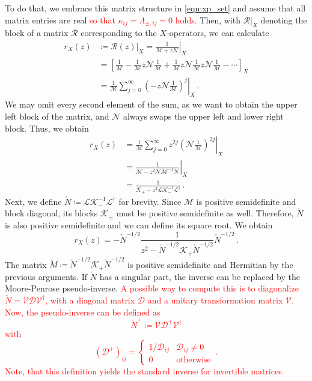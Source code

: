 \documentclass[
    reprint, 
    aps,
    preprintnumbers,
    twocolumn,
    prb,
    superscriptaddress
]{revtex4-2}
\newcommand{\mM}{\mathcal{M}}
\newcommand{\mN}{\mathcal{N}}
\newcommand{\markEdited}{red}
\begin{document}
To do that, we embrace this matrix structure in \eqref{eqn:xp_set} and assume that all matrix entries are real \textcolor{\markEdited}{so that $\kappa_{ij} = \Lambda_{\pm,ij} = 0$ holds}.
Then, with $\mathcal{R}|_X$ denoting the block of a matrix $\mathcal{R}$ corresponding to the $X$-operators, we can calculate
\begin{align}
    r_X (z) &\coloneqq \mathcal{R}(z)|_X = \left. \frac{1}{\mM + z \mN} \right\vert_X \nonumber \\
        &= \left[ \frac{1}{\mM} - \frac{1}{\mM} z \mN \frac{1}{\mM} + \frac{1}{\mM} z \mN \frac{1}{\mM} z \mN \frac{1}{\mM} - \cdots \right]_X \nonumber \\
        &= \left. \frac{1}{\mM} \sum_{j=0}^\infty \left( -z \mN \frac{1}{\mM} \right)^j \right\vert_X \,.
\end{align}
We may omit every second element of the sum, as we want to obtain the upper left block of the matrix, and $\mN$ always swaps the upper left and lower right block.
Thus, we obtain
\begin{align}
    r_X (z) &= \left. \frac{1}{\mM} \sum_{j=0}^\infty z^{2j} \left( \mN \frac{1}{\mM} \right)^{2j} \right\vert_X \nonumber \\
        &= \left. \frac{1}{\mM - z^2 \mN \mM^{-1} \mN} \right\vert_X \nonumber \\
        &= \frac{1}{\mathcal{K}_+ - z^2 \mathcal{L} \mathcal{K}_-^{-1} \mathcal{L}^\dagger}\,.
\end{align}
Next, we define $\check{N} \coloneqq \mathcal{L} \mathcal{K}_-^{-1} \mathcal{L}^\dagger$ for brevity.
Since $\mathcal{M}$ is positive semidefinite and block diagonal, its blocks $\mathcal{K}_\pm$ must be positive semidefinite as well.
Therefore, $\check{N}$ is also positive semidefinite and we can define its square root.
We obtain
\begin{equation}
    \label{eqn:rx}
    r_X (z) = -\check{N}^{-1/2} \frac{1}{z^2 - \check{N}^{-1/2} \mathcal{K}_+ \check{N}^{-1/2}} \check{N}^{-1/2}\,.
\end{equation}
The matrix $\check{M} \coloneqq \check{N}^{-1/2} \mathcal{K}_+ \check{N}^{-1/2}$ is positive semidefinite and Hermitian by the previous arguments.
If $\check{N}$ has a singular part, the inverse can be replaced by the Moore-Penrose pseudo-inverse.
\textcolor{\markEdited}{A possible way to compute this is to diagonalize $\check{N} = \mathcal{V} \mathcal{D} \mathcal{V}^\dagger$, with a diagonal matrix $\mathcal{D}$ and a unitary transformation matrix $\mathcal{V}$.
Now, the pseudo-inverse can be defined as
\begin{equation}
    \check{N}^+ \coloneqq \mathcal{V} \mathcal{D}^+ \mathcal{V}^\dagger
\end{equation}
with
\begin{equation}
    (\mathcal{D}^+)_{ij} = \begin{cases}
        1/\mathcal{D}_{ij} & \mathcal{D}_{ij} \neq 0 \\ 0 & \text{otherwise}
    \end{cases}\,.
\end{equation}
Note, that this definition yields the standard inverse for invertible matrices.}
\end{document}
